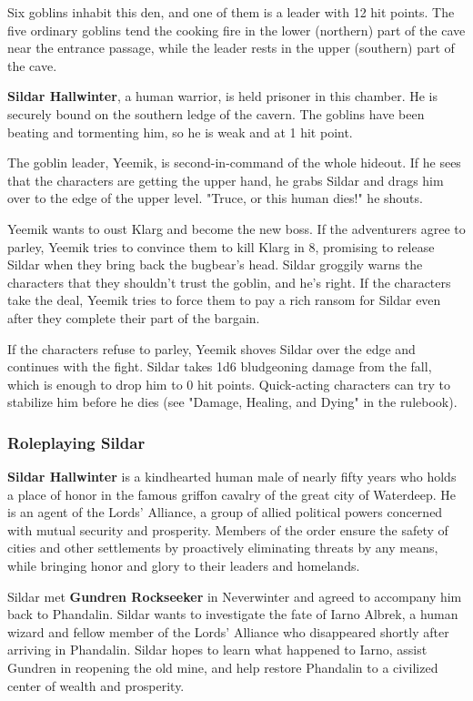 \documentclass[10pt,a4paper,twoside,bg=print,twocolumn,openany,nodeprecatedcode]{dndbook}
\begin{document}
Six goblins inhabit this den, and one of them is a leader with 12 hit points. The five ordinary goblins tend the cooking fire in the lower (northern) part of the cave near the entrance passage, while the leader rests in the upper (southern) part of the cave.

\textbf{Sildar Hallwinter}, a human warrior, is held prisoner in this chamber. He is securely bound on the southern ledge of the cavern. The goblins have been beating and tormenting him, so he is weak and at 1 hit point.

The goblin leader, Yeemik, is second-in-command of the whole hideout. If he sees that the characters are getting the upper hand, he grabs Sildar and drags him over to the edge of the upper level. "Truce, or this human dies!" he shouts.

Yeemik wants to oust Klarg and become the new boss. If the adventurers agree to parley, Yeemik tries to convince them to kill Klarg in 8, promising to release Sildar when they bring back the bugbear's head. Sildar groggily warns the characters that they shouldn't trust the goblin, and he's right. If the characters take the deal, Yeemik tries to force them to pay a rich ransom for Sildar even after they complete their part of the bargain.

If the characters refuse to parley, Yeemik shoves Sildar over the edge and continues with the fight. Sildar takes 1d6 bludgeoning damage from the fall, which is enough to drop him to 0 hit points. Quick-acting characters can try to stabilize him before he dies (see "Damage, Healing, and Dying" in the rulebook).

\subsubsection{Roleplaying Sildar}
\textbf{Sildar Hallwinter} is a kindhearted human male of nearly fifty years who holds a place of honor in the famous griffon cavalry of the great city of Waterdeep. He is an agent of the Lords' Alliance, a group of allied political powers concerned with mutual security and prosperity. Members of the order ensure the safety of cities and other settlements by proactively eliminating threats by any means, while bringing honor and glory to their leaders and homelands.

Sildar met \textbf{Gundren Rockseeker} in Neverwinter and agreed to accompany him back to Phandalin. Sildar wants to investigate the fate of Iarno Albrek, a human wizard and fellow member of the Lords' Alliance who disappeared shortly after arriving in Phandalin. Sildar hopes to learn what happened to Iarno, assist Gundren in reopening the old mine, and help restore Phandalin to a civilized center of wealth and prosperity.
\end{document}
